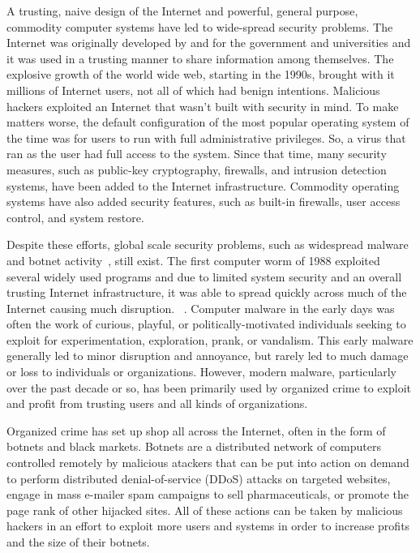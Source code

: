 A trusting, naive design of the Internet and powerful, general purpose, commodity computer systems have led to wide-spread security problems. The Internet was originally developed by and for the government and universities and it was used in a trusting manner to share information among themselves. The explosive growth of the world wide web, starting in the 1990s\cite{Paxson_growthtrends_1994}, brought with it millions of Internet users, not all of which had benign intentions. Malicious hackers exploited an Internet that wasn't built with security in mind. To make matters worse, the default configuration of the most popular operating system of the time was for users to run with full administrative privileges. So, a virus that ran as the user had full access to the system. Since that time, many security measures, such as public-key cryptography, firewalls, and intrusion detection systems, have been added to the Internet infrastructure. Commodity operating systems have also added security features, such as built-in firewalls, user access control, and system restore.

Despite these efforts, global scale security problems, such as widespread malware and botnet activity~\cite{conficker_09, special_ops_09,massive_botnet_09, iBotnet_09, leet09_malware, zombie_computers_nytimes_07}, still exist. The first computer worm of 1988 exploited several widely used programs and due to limited system security and an overall trusting Internet infrastructure, it was able to spread quickly across much of the Internet causing much disruption. ~\cite{Spafford_1989}. Computer malware in the early days was often the work of curious, playful, or politically-motivated individuals seeking to exploit for experimentation, exploration, prank, or vandalism. This early malware generally led to minor disruption and annoyance, but rarely led to much damage or loss to individuals or organizations. However, modern malware, particularly over the past decade or so, has been primarily used by organized crime to exploit and profit from trusting users and all kinds of organizations\cite{paxson_sellingviagra_2009, verizon_data_breach_report_08, verizon_data_breach_report_09}.

Organized crime has set up shop all across the Internet, often in the form of botnets and black markets. Botnets are a distributed network of computers controlled remotely by malicious atackers that can be put into action on demand to perform distributed denial-of-service (DDoS) attacks on targeted websites, engage in mass e-mailer spam campaigns to sell pharmaceuticals, or promote the page rank of other hijacked sites. All of these actions can be taken by malicious hackers in an effort to exploit more users and systems in order to increase profits and the size of their botnets.

